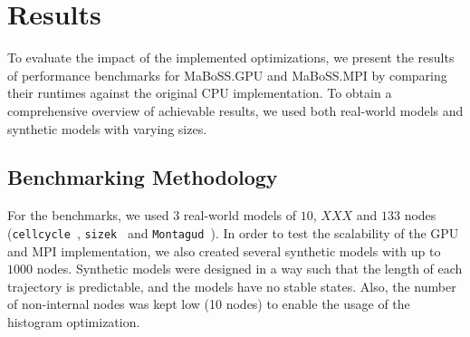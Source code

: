 \documentclass[a4paper,num-refs]{oup-contemporary}
\begin{document}


\section{Results}

To evaluate the impact of the implemented optimizations, we present the results of performance benchmarks for MaBoSS.GPU and MaBoSS.MPI by comparing their runtimes against the original CPU implementation. To obtain a comprehensive overview of achievable results, we used both real-world models and synthetic models with varying sizes.

\subsection{Benchmarking Methodology}

For the benchmarks, we used $3$ real-world models of $10$, $XXX$ and $133$ nodes (\texttt{cellcycle}~\cite{faure2006cellcycle}, \texttt{sizek}~\cite{sizek2019boolean} and \texttt{Montagud}~\cite{montagud2022prostate}). In order to test the scalability of the GPU and MPI implementation, we also created several synthetic models with up to $1000$ nodes. Synthetic models were designed in a way such that the length of each trajectory is predictable, and the models have no stable states. Also, the number of non-internal nodes was kept low (10 nodes) to enable the usage of the histogram optimization.
\end{document}
